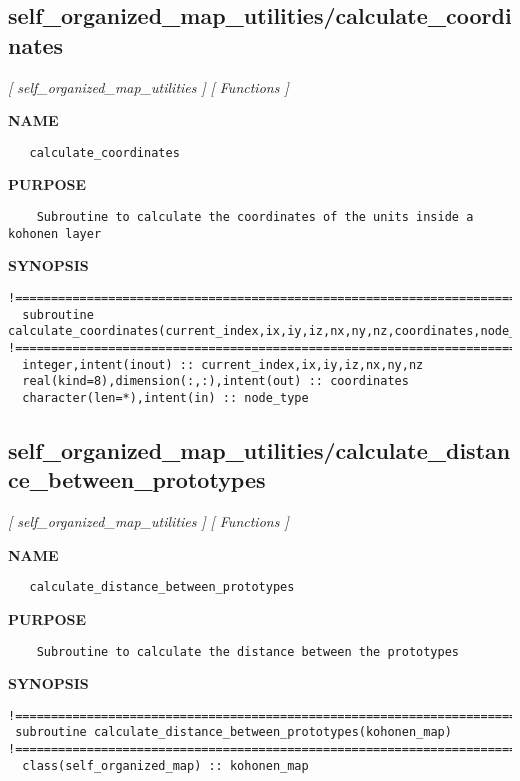 \documentclass{article}
\begin{document}
\subsection{self\_organized\_map\_utilities/calculate\_coordinates}
\textsl{[ self\_organized\_map\_utilities ]}
\textsl{[ Functions ]}

\label{ch:robo35}
\label{ch:self_organized_map_utilities_calculate_coordinates}
\textbf{NAME}
\begin{verbatim}
   calculate_coordinates
\end{verbatim}
\textbf{PURPOSE}
\begin{verbatim}
    Subroutine to calculate the coordinates of the units inside a kohonen layer 
\end{verbatim}
\textbf{SYNOPSIS}
\begin{verbatim}
!========================================================================================
  subroutine calculate_coordinates(current_index,ix,iy,iz,nx,ny,nz,coordinates,node_type)
!========================================================================================
  integer,intent(inout) :: current_index,ix,iy,iz,nx,ny,nz
  real(kind=8),dimension(:,:),intent(out) :: coordinates
  character(len=*),intent(in) :: node_type
\end{verbatim}
\newpage
\subsection{self\_organized\_map\_utilities/calculate\_distance\_between\_prototypes}
\textsl{[ self\_organized\_map\_utilities ]}
\textsl{[ Functions ]}

\label{ch:robo36}
\label{ch:self_organized_map_utilities_calculate_distance_between_prototypes}
\textbf{NAME}
\begin{verbatim}
   calculate_distance_between_prototypes
\end{verbatim}
\textbf{PURPOSE}
\begin{verbatim}
    Subroutine to calculate the distance between the prototypes
\end{verbatim}
\textbf{SYNOPSIS}
\begin{verbatim}
!========================================================================================
 subroutine calculate_distance_between_prototypes(kohonen_map)
!========================================================================================
  class(self_organized_map) :: kohonen_map
\end{verbatim}
\newpage
\end{document}
